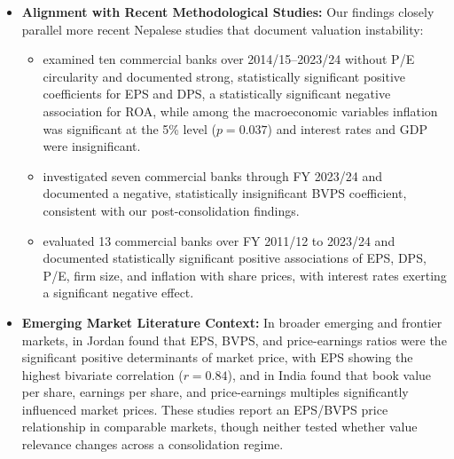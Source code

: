 \begin{itemize}
\begin{itemize}
        \item \textit{Sample Harmonization:} In reconciling prior samples, \citet{bhattarai2014} analyzed nine commercial banks over 2006--2014, while \citet{joshi2023} analyzed seven commercial banks over 2012/13--2021/22. Both examined pre-consolidation periods under pooled structures. Whether that pooling explains their higher reported significance is not established by this study's comparison, since the pooled EPS slope here is itself insignificant ($p = 0.128$).
    \end{itemize}
    \item \textbf{Alignment with Recent Methodological Studies:}
    Our findings closely parallel more recent Nepalese studies that document valuation instability:
    \begin{itemize}
        \item \citet{chaudhari2025} examined ten commercial banks over 2014/15--2023/24 without P/E circularity and documented strong, statistically significant positive coefficients for EPS and DPS, a statistically significant negative association for ROA, while among the macroeconomic variables inflation was significant at the 5\% level ($p = 0.037$) and interest rates and GDP were insignificant.
        \item \citet{pant2024} investigated seven commercial banks through FY 2023/24 and documented a negative, statistically insignificant BVPS coefficient, consistent with our post-consolidation findings.
        \item \citet{timalsina2026} evaluated 13 commercial banks over FY 2011/12 to 2023/24 and documented statistically significant positive associations of EPS, DPS, P/E, firm size, and inflation with share prices, with interest rates exerting a significant negative effect.
    \end{itemize}
    \item \textbf{Emerging Market Literature Context:}
    In broader emerging and frontier markets, \citet{almumani2014} in Jordan found that EPS, BVPS, and price-earnings ratios were the significant positive determinants of market price, with EPS showing the highest bivariate correlation ($r = 0.84$), and \citet{malhotra2013} in India found that book value per share, earnings per share, and price-earnings multiples significantly influenced market prices. These studies report an EPS/BVPS price relationship in comparable markets, though neither tested whether value relevance changes across a consolidation regime.
\end{itemize}

